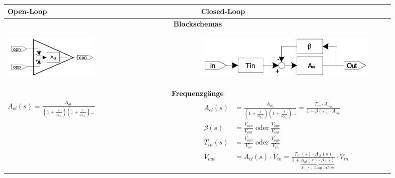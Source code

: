 \begin{tabular}{|p{0.45\linewidth}|p{0.45\linewidth}|}
	\hline
	\textbf{Open-Loop}
		& \textbf{Closed-Loop}\\
	\hline
	\multicolumn{2}{|c|}{\textbf{Blockschemas}}\\
	\hline
    \vspace{-7mm}
	\begin{center}
	 	\includegraphics[height=2cm, valign=t]{./pictures/opAmpOL.png}
	\end{center}
		& \vspace{-7mm}
          \begin{center}
			\includegraphics[height=2cm, valign=t]{./pictures/opAmpCL.png}
		  \end{center}\\
	\hline
	\multicolumn{2}{|c|}{\textbf{Frequenzgänge}}\\
	\hline
	\large{$A_{ol}(s)=\frac{A_{ol_0}}{(1+\frac{s}{\omega_{p_{ol_1}}})(1+\frac{s}{\omega_{p_{ol_2}}})\dots}$}
	& $\begin{aligned}
        A_{cl}(s) &= \frac{A_{cl_0}}{(1+\frac{s}{\omega_{p_{cl_1}}})(1+\frac{s}{\omega_{p_{cl_2}}})\dots} = \frac{T_{in}\cdot A_{ol_0}}{1+\beta(s)\cdot A_{ol_0}}\\
		\beta(s) &= \frac{V_{opn}}{V_{out}}\;\text{oder}\;\frac{V_{opp}}{V_{out}}\\
		T_{in}(s) &= \frac{V_{opn}}{V_{in}}\;\text{oder}\;\frac{V_{opp}}{V_{in}}\\
        V_{out} &= A_{cl}(s)\cdot V_{in} = \frac{T_{in}(s)\cdot A_{ol}(s)}{1 + \underbrace{A_{ol}(s)\cdot \beta(s)}_{T_s(s):Loop-Gain}} \cdot V_{in}
	   \end{aligned}$\\
	\hline
\end{tabular}
\\ \\
